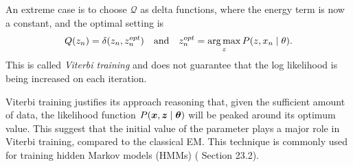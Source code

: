 An extreme case is to choose \(\mathcal{Q}\) as delta functions, where the energy term is now a constant, and the optimal setting is
\[
Q(z_{n}) = \delta (z_{n}, z_{n}^{opt}) \quad \text{and} \quad z_{n}^{opt} = \operatorname*{arg\,max}_{z}P(z , x_{n} \mid \theta).
\]
This is called \emph{Viterbi training} and does not guarantee that the log likelihood is being increased on each iteration.

Viterbi training justifies its approach reasoning that, given the sufficient amount of data, the likelihood function \(P(\bm{x}, \bm{z} \mid \bm{\theta})\) will be peaked around its optimum value. This suggest that the initial value of the parameter plays a major role in Viterbi training, compared to the classical EM. This technique is commonly used for training hidden Markov models (HMMs) (\cite{barber} Section 23.2).
